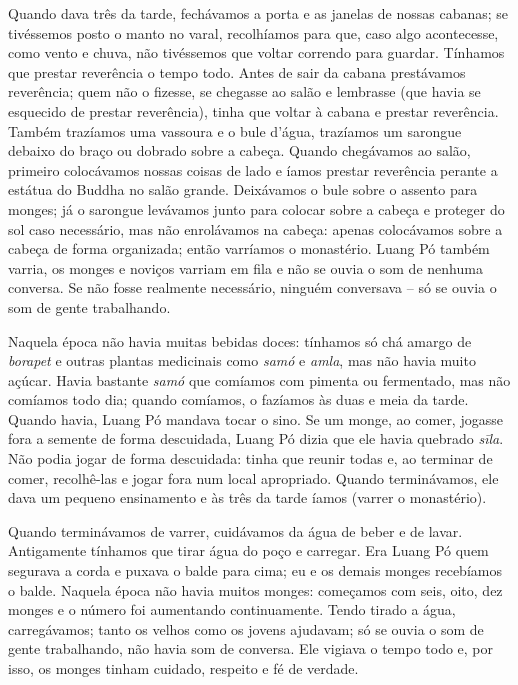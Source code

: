 Quando dava três da tarde, fechávamos a porta e as janelas de nossas
cabanas; se tivéssemos posto o manto no varal, recolhíamos para que,
caso algo acontecesse, como vento e chuva, não tivéssemos que voltar
correndo para guardar. Tínhamos que prestar reverência o tempo todo.
Antes de sair da cabana prestávamos reverência; quem não o fizesse, se
chegasse ao salão e lembrasse (que havia se esquecido de prestar
reverência), tinha que voltar à cabana e prestar reverência. Também
trazíamos uma vassoura e o bule d'água, \mbox{trazíamos} um sarongue debaixo do
braço ou dobrado sobre a cabeça. Quando chegávamos ao salão, primeiro
colocávamos nossas coisas de lado e íamos prestar reverência perante a
estátua do Buddha no salão grande. Deixávamos o bule sobre o assento
para monges; já o sarongue levávamos junto para colocar sobre a cabeça e
proteger do sol caso necessário, mas não enrolávamos na cabeça: apenas
colocávamos sobre a cabeça de forma organizada; então varríamos o
monastério. Luang Pó também varria, os monges e noviços varriam em fila
e não se ouvia o som de nenhuma conversa. Se não fosse realmente
necessário, ninguém conversava -- só se ouvia o som de gente
trabalhando.

Naquela época não havia muitas bebidas doces: tínhamos só chá amargo de
\emph{borapet} e outras plantas medicinais como \emph{samó} e
\emph{amla}, mas não havia muito açúcar. Havia bastante \emph{samó} que
comíamos com pimenta ou fermentado, mas não comíamos todo dia; quando
comíamos, o fazíamos às duas e meia da tarde. Quando havia, Luang Pó
mandava tocar o sino. Se um monge, ao comer, jogasse fora a semente de
forma descuidada, Luang Pó dizia que ele havia quebrado \emph{sīla}. Não
podia jogar de forma descuidada: tinha que reunir todas e, ao terminar
de comer, recolhê-las e jogar fora num local apropriado. Quando
terminávamos, ele dava um pequeno ensinamento e às três da tarde íamos
(varrer o monastério).

Quando terminávamos de varrer, cuidávamos da água de beber e de lavar.
Antigamente tínhamos que tirar água do poço e carregar. Era Luang Pó
quem segurava a corda e puxava o balde para cima; eu e os demais monges
recebíamos o balde. Naquela época não havia muitos monges: começamos com
seis, oito, dez monges e o número foi aumentando continuamente. Tendo
tirado a água, carregávamos; tanto os velhos como os jovens ajudavam; só
se ouvia o som de gente trabalhando, não havia som de conversa. Ele
vigiava o tempo todo e, por isso, os monges tinham cuidado, respeito e
fé de verdade.


